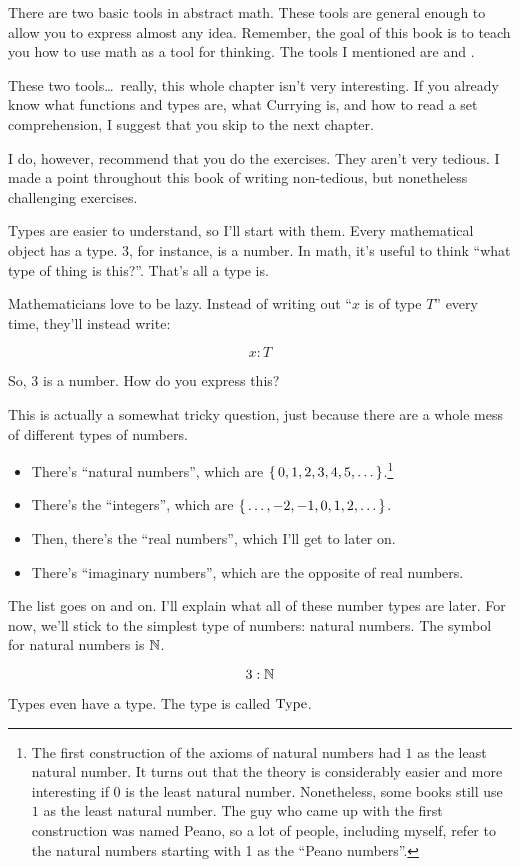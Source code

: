 There are two basic tools in abstract math. These tools are general enough to
allow you to express almost any idea. Remember, the goal of this book is to
teach you how to use math as a tool for thinking. The tools I mentioned are
 and .

These two tools\dots\ really, this whole chapter isn't very interesting. If you
already know what functions and types are, what Currying is, and how to read a
set comprehension, I suggest that you skip to the next chapter.

I do, however, recommend that you do the exercises. They aren't very tedious. I
made a point throughout this book of writing non-tedious, but nonetheless
challenging exercises.


Types are easier to understand, so I'll start with them. Every mathematical
object has a type. $3$, for instance, is a number. In math, it's useful to think
``what type of thing is this?''. That's all a type is.

Mathematicians love to be lazy. Instead of writing out ``$x$ is of type $T$''
every time, they'll instead write:

\begin{equation}
    x : T
\end{equation}

So, $3$ is a number. How do you express this?

This is actually a somewhat tricky question, just because there are a whole mess
of different types of numbers.

\begin{itemize}
  \item There's ``natural numbers'', which are
    $\left\{\, 0, 1, 2, 3, 4, 5, \dots \,\right\}$.\footnote{The first construction of the
      axioms of natural numbers had $1$ as the least natural number. It turns
      out that the theory is considerably easier and more interesting if $0$ is
      the least natural number. Nonetheless, some books still use $1$ as the
      least natural number. The guy who came up with the first construction was
      named Peano, so a lot of people, including myself, refer to the natural
      numbers starting with 1 as the ``Peano numbers''.}
  \item There's the ``integers'', which are
    \(\left\{\, \dots, -2, -1, 0, 1, 2, \dots \,\right\}\).
  \item Then, there's the ``real numbers'', which I'll get to later on.
  \item There's ``imaginary numbers'', which are the opposite of real
    numbers.
\end{itemize}

The list goes on and on. I'll explain what all of these number types are later.
For now, we'll stick to the simplest type of numbers: natural numbers. The
symbol for natural numbers is $\mathbb{N}$.

\begin{equation}
    3 : \mathbb{N}
\end{equation}

Types even have a type. The type is called $\text{Type}$.



